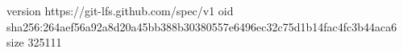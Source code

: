 version https://git-lfs.github.com/spec/v1
oid sha256:264aef56a92a8d20a45bb388b30380557e6496ec32c75d1b14fac4fc3b44aca6
size 325111
